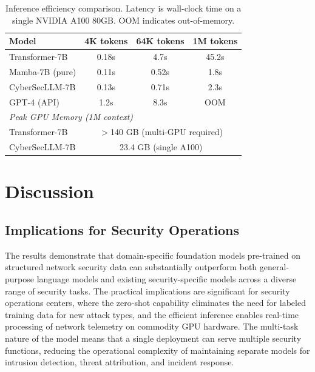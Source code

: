 \documentclass[journal]{IEEEtran}
\newcommand{\modelname}{CyberSecLLM}
\begin{document}
\begin{table}[!t]
\centering
\caption{Inference efficiency comparison. Latency is wall-clock time on a single NVIDIA A100 80GB. OOM indicates out-of-memory.}
\label{tab:efficiency}
\renewcommand{\arraystretch}{1.1}
\begin{tabular}{lccc}
\toprule
\textbf{Model} & \textbf{4K tokens} & \textbf{64K tokens} & \textbf{1M tokens} \\
\midrule
Transformer-7B   & 0.18s & 4.7s   & 45.2s \\
Mamba-7B (pure)  & 0.11s & 0.52s  & 1.8s \\
\modelname{}-7B  & 0.13s & 0.71s  & 2.3s \\
GPT-4 (API)      & 1.2s  & 8.3s   & OOM \\
\midrule
\multicolumn{4}{l}{\textit{Peak GPU Memory (1M context)}} \\
\midrule
Transformer-7B   & \multicolumn{3}{c}{$>$140 GB (multi-GPU required)} \\
\modelname{}-7B  & \multicolumn{3}{c}{23.4 GB (single A100)} \\
\bottomrule
\end{tabular}
\end{table}

\section{Discussion}
\label{sec:discussion}

\subsection{Implications for Security Operations}
\label{subsec:implications}

The results demonstrate that domain-specific foundation models pre-trained on structured network security data can substantially outperform both general-purpose language models and existing security-specific models across a diverse range of security tasks. The practical implications are significant for security operations centers, where the zero-shot capability eliminates the need for labeled training data for new attack types, and the efficient inference enables real-time processing of network telemetry on commodity GPU hardware. The multi-task nature of the model means that a single deployment can serve multiple security functions, reducing the operational complexity of maintaining separate models for intrusion detection, threat attribution, and incident response.
\end{document}
